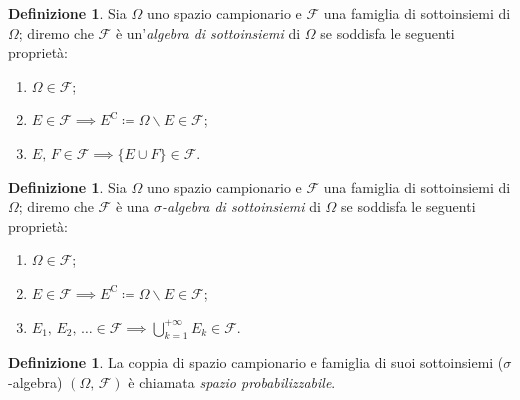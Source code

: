 \documentclass[12pt,openany]{amsbook}
\theoremstyle{plain}
\numberwithin{equation}{section} %
\theoremstyle{definition}
\newtheorem{defn}[thm]{Definizione}
\newcommand\nbdash{\nobreakdash-\hspace{0pt}}
\begin{document}
            \begin{defn}
                Sia $\Omega$ uno spazio campionario e $\mathscr{F}$ una famiglia di sottoinsiemi di $\Omega$; diremo che $\mathscr{F}$ è un'\textit{algebra di sottoinsiemi} di $\Omega$ se soddisfa le seguenti proprietà:
                \begin{enumerate}
                    \item $\Omega \in \mathscr{F}$;
                    \item $E \in \mathscr{F} \implies E^{\text{C}} \coloneqq \Omega \backslash E \in \mathscr{F}$;
                    \item $E,\,F \in \mathscr{F} \implies \{E \cup F\} \in \mathscr{F}$.
                \end{enumerate}
            \end{defn}
            \begin{defn}
                Sia $\Omega$ uno spazio campionario e $\mathscr{F}$ una famiglia di sottoinsiemi di $\Omega$; diremo che $\mathscr{F}$ è una \textit{$\sigma$\nbdash algebra di sottoinsiemi} di $\Omega$ se soddisfa le seguenti proprietà:
                \begin{enumerate}
                    \item $\Omega \in \mathscr{F}$;
                    \item $E \in \mathscr{F} \implies E^{\text{C}} \coloneqq \Omega \backslash E \in \mathscr{F}$;
                    \item $E_1,\,E_2,\,\ldots \in \mathscr{F} \implies \bigcup_{k=1}^{+\infty}E_k \in \mathscr{F}$.
                \end{enumerate}
            \end{defn}
            \begin{defn}
                La coppia di spazio campionario e famiglia di suoi sottoinsiemi ($\sigma$\nbdash algebra) $(\Omega,\,\mathscr{F})$ è chiamata \textit{spazio probabilizzabile}.
            \end{defn}
\end{document}
